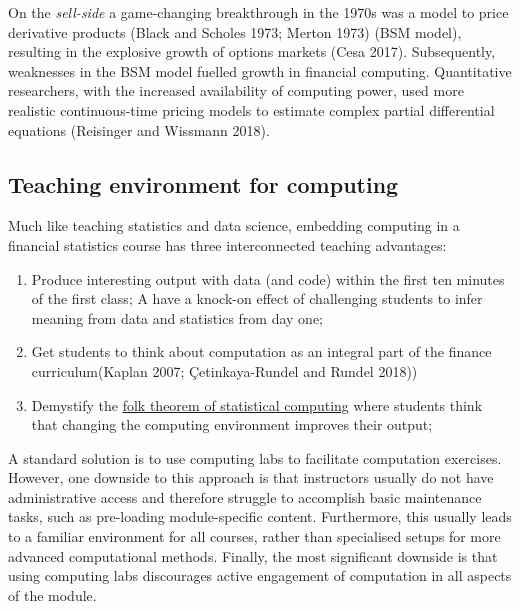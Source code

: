 \documentclass{article}
\providecommand{\tightlist}{%
  \setlength{\itemsep}{0pt}\setlength{\parskip}{0pt}}
\begin{document}
On the \emph{sell-side} a game-changing breakthrough in the 1970s was a
model to price derivative products (Black and Scholes 1973; Merton 1973)
(BSM model), resulting in the explosive growth of options markets (Cesa
2017). Subsequently, weaknesses in the BSM model fuelled growth in
financial computing. Quantitative researchers, with the increased
availability of computing power, used more realistic continuous-time
pricing models to estimate complex partial differential equations
(Reisinger and Wissmann 2018).

\hypertarget{teaching-environment-for-computing}{%
\subsection{Teaching environment for
computing}\label{teaching-environment-for-computing}}

Much like teaching statistics and data science, embedding computing in a
financial statistics course has three interconnected teaching
advantages:

\begin{enumerate}
\def\labelenumi{\arabic{enumi}.}
\tightlist
\item
  Produce interesting output with data (and code) within the first ten
  minutes of the first class; A have a knock-on effect of challenging
  students to infer meaning from data and statistics from day one;
\item
  Get students to think about computation as an integral part of the
  finance curriculum(Kaplan 2007; Çetinkaya-Rundel and Rundel 2018))
\item
  Demystify the
  \href{https://statmodeling.stat.columbia.edu/2008/05/13/the_folk_theore/}{folk
  theorem of statistical computing} where students think that changing
  the computing environment improves their output;
\end{enumerate}

A standard solution is to use computing labs to facilitate computation
exercises. However, one downside to this approach is that instructors
usually do not have administrative access and therefore struggle to
accomplish basic maintenance tasks, such as pre-loading module-specific
content. Furthermore, this usually leads to a familiar environment for
all courses, rather than specialised setups for more advanced
computational methods. Finally, the most significant downside is that
using computing labs discourages active engagement of computation in all
aspects of the module.
\end{document}
